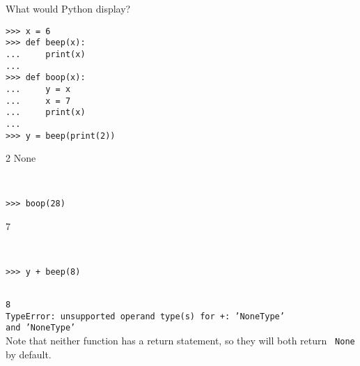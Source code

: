 \question What would Python display?
\begin{lstlisting}
>>> x = 6
>>> def beep(x):
...     print(x)
...
>>> def boop(x):
...     y = x
...     x = 7
...     print(x)
...
>>> y = beep(print(2))
\end{lstlisting}
\begin{solution}

2
None
\end{solution}
\begin{lstlisting}


>>> boop(28)
\end{lstlisting}
\begin{solution}
7
\end{solution}
\begin{lstlisting}


>>> y + beep(8)
\end{lstlisting}
\begin{solution}
{\tt ~ \\ 8 \\
TypeError: unsupported operand type(s) for +: 'NoneType' \\ and 'NoneType'} \\
Note that neither function has a return statement, so they will both return {\tt
None} by default.
\end{solution}
